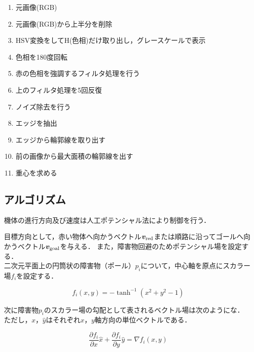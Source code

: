 \documentclass[11pt,a4]{jsarticle}
\begin{document}
  \begin{enumerate}
    \item 元画像(RGB)
    \item 元画像(RGB)から上半分を削除
    \item HSV変換をしてH(色相)だけ取り出し，グレースケールで表示
    \item 色相を180度回転
    \item 赤の色相を強調するフィルタ処理を行う
    \item 上のフィルタ処理を5回反復
    \item ノイズ除去を行う
    \item エッジを抽出
    \item エッジから輪郭線を取り出す
    \item 前の画像から最大面積の輪郭線を出す
    \item 重心を求める
  \end{enumerate}


\subsection{アルゴリズム} 

  機体の進行方向及び速度は人工ポテンシャル法により制御を行う．

  目標方向として，赤い物体へ向かうベクトル$\bm{v}_{\rm{red}}$または順路に沿ってゴールへ向かうベクトル$\bm{v}_{\rm{goal}}$を与える．
  また，障害物回避のためポテンシャル場を設定する．\\

  二次元平面上の円筒状の障害物（ポール）$p_i$について，中心軸を原点にスカラー場$f_i$を設定する．

  \begin{equation}
    f_i(x,y) = - \tanh^{-1}(x^2 + y^2 - 1)
  \end{equation}

  次に障害物$p_i$のスカラー場の勾配として表されるベクトル場は次のようにな．
  ただし，$\hat{x}$，$\hat{y}$はそれぞれ$x$，$y$軸方向の単位ベクトルである．

  \begin{equation}
    \frac{\partial f_i}{\partial x}\hat{x} + \frac{\partial f_i}{\partial y}\hat{y} = \nabla f_i(x,y)
  \end{equation}
\end{document}
